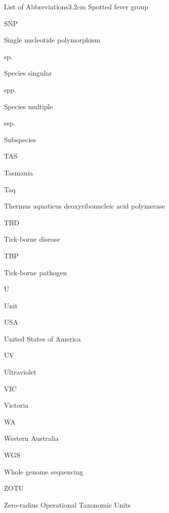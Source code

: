\documentclass[a4paper, nobind]{templates/ociamthesis}
\begin{document}
\begin{romanpages}
\begin{mclistof}{List of Abbreviations}{3.2cm}
Spotted fever group

\item[SNP]

Single nucleotide polymorphism

\item[sp.]

Species singular

\item[spp.]

Species multiple

\item[ssp.]

Subspecies

\item[TAS]

Tasmania

\item[Taq]

Thermus aquaticus deoxyribonucleic acid polymerase

\item[TBD]

Tick-borne disease

\item[TBP]

Tick-borne pathogen

\item[U]

Unit

\item[USA]

United States of America

\item[UV]

Ultraviolet

\item[VIC]

Victoria

\item[WA]

Western Australia

\item[WGS]

Whole genome sequencing

\item[ZOTU]

Zero-radius Operational Taxonomic Units

\end{mclistof} 


\end{romanpages}
\end{document}
